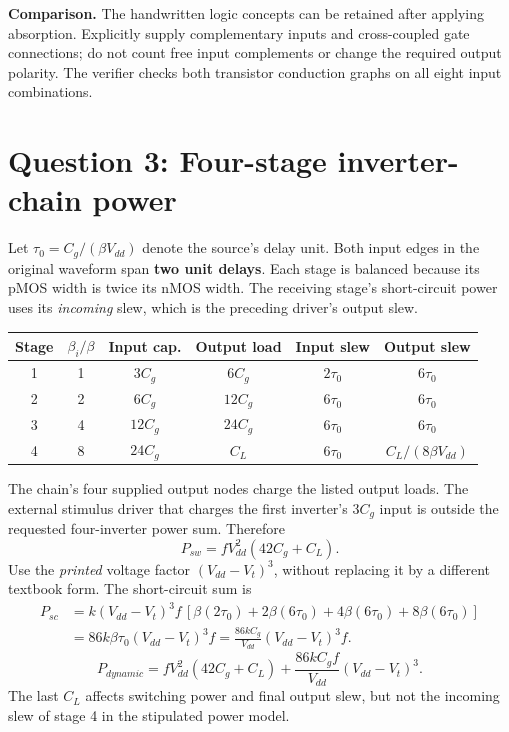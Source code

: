 \documentclass[10pt]{article}
\begin{document}
\textbf{Comparison.} The handwritten logic concepts can be retained after applying absorption. Explicitly supply complementary inputs and cross-coupled gate connections; do not count free input complements or change the required output polarity. The verifier checks both transistor conduction graphs on all eight input combinations.

\newpage\section*{Question 3: Four-stage inverter-chain power}
Let $\tau_0=C_g/(\beta V_{dd})$ denote the source's delay unit. Both input edges in the original waveform span \textbf{two unit delays}. Each stage is balanced because its pMOS width is twice its nMOS width. The receiving stage's short-circuit power uses its \emph{incoming} slew, which is the preceding driver's output slew.
\begin{center}\begin{tabular}{c|ccccc}\toprule
Stage&$\beta_i/\beta$&Input cap.&Output load&Input slew&Output slew\\\midrule
1&1&$3C_g$&$6C_g$&$2\tau_0$&$6\tau_0$\\
2&2&$6C_g$&$12C_g$&$6\tau_0$&$6\tau_0$\\
3&4&$12C_g$&$24C_g$&$6\tau_0$&$6\tau_0$\\
4&8&$24C_g$&$C_L$&$6\tau_0$&$C_L/(8\beta V_{dd})$\\\bottomrule
\end{tabular}\end{center}
The chain's four supplied output nodes charge the listed output loads. The external stimulus driver that charges the first inverter's $3C_g$ input is outside the requested four-inverter power sum. Therefore
\[\boxed{P_{sw}=fV_{dd}^2(42C_g+C_L).}\]
Use the \emph{printed} voltage factor $(V_{dd}-V_t)^3$, without replacing it by a different textbook form. The short-circuit sum is
\begin{align*}
P_{sc}&=k(V_{dd}-V_t)^3f\,[\beta(2\tau_0)+2\beta(6\tau_0)+4\beta(6\tau_0)+8\beta(6\tau_0)]\\
&=86k\beta\tau_0(V_{dd}-V_t)^3f
=\frac{86kC_g}{V_{dd}}(V_{dd}-V_t)^3f.
\end{align*}
\[\boxed{P_{dynamic}=fV_{dd}^2(42C_g+C_L)+\frac{86kC_gf}{V_{dd}}(V_{dd}-V_t)^3.}\]
The last $C_L$ affects switching power and final output slew, but not the incoming slew of stage 4 in the stipulated power model.
\end{document}
